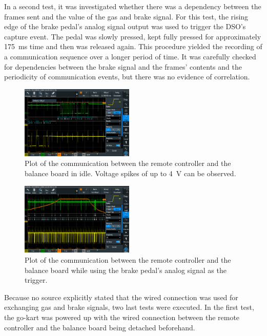 \par
In a second test, it was investigated whether there was a dependency between the frames sent and the value of the gas and brake signal.
For this test, the rising edge of the brake pedal's analog signal output was used to trigger the DSO's capture event.
The pedal was slowly pressed, kept fully pressed for approximately \SI{175}{\milli\second} time and then was released again.
This procedure yielded the recording of a communication sequence over a longer period of time.
It was carefully checked for dependencies between the brake signal and the frames' contents and the periodicity of communication events, but there was no evidence of correlation.
\begin{figure}[!htbp]
\centering
  \includegraphics[width=0.48\textwidth]{images/uart_dso_1.png}
\caption{Plot of the communication between the remote controller and the balance board in idle. Voltage spikes of up to \SI{4}{\volt} can be observed.}
\label{fig:dso_uart_plot1}
\end{figure}
\FloatBarrier\noindent
\begin{figure}[!htbp]
\centering
  \includegraphics[width=0.48\textwidth]{images/uart_dso_2.png}
\caption{Plot of the communication between the remote controller and the balance board while using the brake pedal's analog signal as the trigger.}
\label{fig:dso_uart_plot2}
\end{figure}
\FloatBarrier\noindent
\par
Because no source explicitly stated that the wired connection was used for exchanging gas and brake signals, two last tests were executed.
In the first test, the go-kart was powered up with the wired connection between the remote controller and the balance board being detached beforehand.
